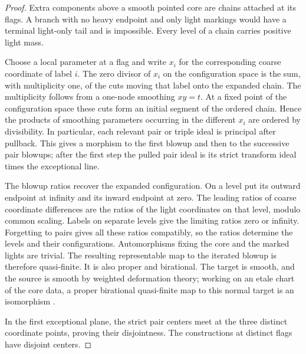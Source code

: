 \begin{proof}
Extra components above a smooth pointed core are chains attached at
its flags.  A branch with no heavy endpoint and only light markings
would have a terminal light-only tail and is impossible.  Every level
of a chain carries positive light mass.

Choose a local parameter at a flag and write $x_i$ for the corresponding
coarse coordinate of label $i$.  The zero divisor of $x_i$ on the
configuration space is the sum, with multiplicity one, of the cuts
moving that label onto the expanded chain.  The multiplicity follows
from a one-node smoothing $xy=t$.  At a fixed point of the
configuration space these cuts form an initial segment of the
ordered chain.  Hence the products of smoothing parameters occurring
in the different $x_i$ are ordered by divisibility.  In particular,
each relevant pair or triple ideal is principal after pullback.
This gives a morphism to the first blowup and then to the successive
pair blowups; after the first step the pulled pair ideal is its strict
transform ideal times the exceptional line.

The blowup ratios recover the expanded configuration.  On a level
put its outward endpoint at infinity and its inward endpoint at zero.
The leading ratios of coarse coordinate differences are the ratios
of the light coordinates on that level, modulo common scaling.
Labels on separate levels give the limiting ratios zero or infinity.
Forgetting to pairs gives all these ratios compatibly, so the ratios
determine the levels and their configurations.  Automorphisms fixing
the core and the marked lights are trivial.  The resulting
representable map to the iterated blowup is therefore quasi-finite.
It is also proper and birational.  The target is smooth, and the
source is smooth by weighted deformation theory; working on
an etale chart of the core data, a proper birational quasi-finite map
to this normal target is an isomorphism
\cite[Tags~02LS and~0AB1]{Stacks}.

In the first exceptional plane, the strict pair centers meet at the
three distinct coordinate points, proving their disjointness.
The constructions at distinct flags have disjoint centers.
\end{proof}

